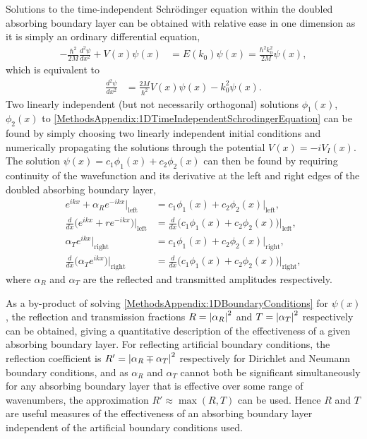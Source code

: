 Solutions to the time-independent Schrödinger equation within the doubled absorbing boundary layer can be obtained with relative ease in one dimension as it is simply an ordinary differential equation,
\begin{align}
    -\frac{\hbar^2}{2M}\frac{d^2 \psi}{dx^2} + V(x) \psi(x) &= E(k_0) \psi(x) = \frac{\hbar^2 k_0^2}{2M} \psi(x),
\end{align}
which is equivalent to
\begin{align}
    \frac{d^2 \psi}{dx^2} &= \frac{2 M}{\hbar^2} V(x) \psi(x) - k_0^2 \psi(x).
    \label{MethodsAppendix:1DTimeIndependentSchrodingerEquation}
\end{align}
Two linearly independent (but not necessarily orthogonal) solutions $\phi_1(x)$, $\phi_2(x)$ to \eqref{MethodsAppendix:1DTimeIndependentSchrodingerEquation} can be found by simply choosing two linearly independent initial conditions and numerically propagating the solutions through the potential $V(x) = -i V_I(x)$. The solution $\psi(x) = c_1 \phi_1(x) + c_2 \phi_2(x)$ can then be found by requiring continuity of the wavefunction and its derivative at the left and right edges of the doubled absorbing boundary layer,
\begin{subequations}
    \label{MethodsAppendix:1DBoundaryConditions}
    \begin{align}
        e^{i k x} + \alpha_R e^{-i k x} \Big|_\text{left} &=  c_1 \phi_1(x) + c_2 \phi_2(x) \Big|_\text{left}, \\
        \frac{d}{dx}\big( e^{i k x} + r e^{-i k x}\big) \Big|_\text{left} &=  \frac{d}{dx} \big( c_1 \phi_1(x) + c_2 \phi_2(x) \big) \Big|_\text{left},\\
        \alpha_T e^{i k x} \Big|_\text{right} &= c_1 \phi_1(x) + c_2 \phi_2(x) \Big|_\text{right}, \\
        \frac{d}{dx} \big( \alpha_T e^{i k x} \big) \Big|_\text{right} &= \frac{d}{dx} \big( c_1 \phi_1(x) + c_2 \phi_2(x) \big) \Big|_\text{right},
    \end{align}
\end{subequations}
where $\alpha_R$ and $\alpha_T$ are the reflected and transmitted amplitudes respectively. 

As a by-product of solving \eqref{MethodsAppendix:1DBoundaryConditions} for $\psi(x)$, the reflection and transmission fractions $R=\left|\alpha_R\right|^2$ and $T=\left|\alpha_T\right|^2$ respectively can be obtained, giving a quantitative description of the effectiveness of a given absorbing boundary layer. For reflecting artificial boundary conditions, the reflection coefficient is $R'= \left|\alpha_R \mp \alpha_T\right|^2$ respectively for Dirichlet and Neumann boundary conditions, and as $\alpha_R$ and $\alpha_T$ cannot both be significant simultaneously for any absorbing boundary layer that is effective over some range of wavenumbers, the approximation $R' \approx \max(R, T)$ can be used.  Hence $R$ and $T$ are useful measures of the effectiveness of an absorbing boundary layer independent of the artificial boundary conditions used.

